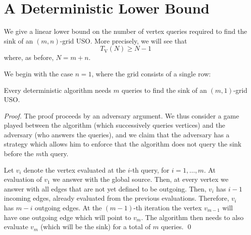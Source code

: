 \documentclass[runningheads,a4paper]{llncs}
\newcommand{\timeVertex}{\ensuremath{T_\mathrm{V}}}
\begin{document}
\section{A Deterministic Lower Bound}
\label{section:a_deterministic_lower_bound}

We give a linear lower bound on the number of vertex queries required to find
the sink of an $(m,n)$-grid USO.
More precisely, we will see that
\[
    \timeVertex(N) \ge N-1
\]
where, as before, $N = m+n$.

We begin with the case $n=1$, where the grid consists of a single row:

\begin{lemma}\label{lem:kx1}
Every deterministic algorithm needs $m$ queries to find the sink of an $(m,1)$-grid USO.
\end{lemma}
\begin{proof}
    The proof proceeds by an adversary argument.
    We thus consider a game played between the algorithm (which successively
    queries vertices) and the adversary (who answers the queries),
    and we claim that the adversary has a strategy which allows him to enforce
    that the algorithm does not query the sink before the $m$th query.

Let $v_i$ denote the vertex evaluated at the $i$-th query, for $i=1,\ldots, m$. At evaluation of $v_1$ we answer with the global source. Then, at every vertex
we answer with all edges that are not yet defined to be outgoing. Then, $v_i$ has $i-1$ incoming edges, already evaluated from the previous evaluations. 
Therefore, $v_i$ has $m-i$ outgoing edges. At the $(m-1)$-th iteration the vertex $v_{m-1}$ will have one outgoing edge which will point to $v_m$.
The algorithm then needs to also evaluate $v_m$ (which will be the sink) for a total of $m$ queries. \qed 
\end{proof}
\end{document}
